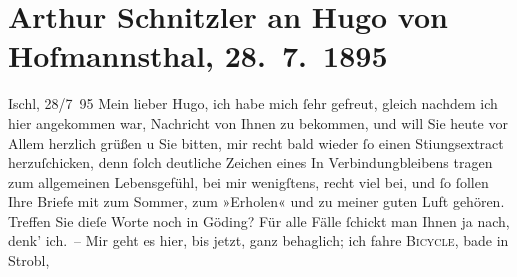

         
         \renewcommand{\erwaehntePersonen}{Personen: Julius Frauenstädt, Paul Goldmann, Hugo von Hofmannsthal, Ernst Otto Lindner, Ludwig Schemann, Arthur Schopenhauer}
         \renewcommand{\erwaehnteOrte}{Orte: Bad Ischl, Hodonín, Kopenhagen, Strobl, Wien}
         \renewcommand{\erwaehnteWerke}{Werke: Arthur Schopenhauer. Von ihm. Über ihn, Die Frau des Weisen. Erzählung, Die Kartause von Parma, Freiwild. Schauspiel in 3 Akten, Schopenhauer-Briefe, West-östlicher Divan}
               \section[Arthur Schnitzler an Hugo von Hofmannsthal, 28. 7. 1895]{ Arthur Schnitzler an Hugo von Hofmannsthal, 28. 7. 1895}\nopagebreak{}\rehead{ }\begin{ledgroupsized}[t]{13cm}\normalsize\beginnumbering{} \toendnotes[C]{\smallbreak\pagebreak[2]} 
\toendnotes[C]{\smallbreak}\pstart
           \raggedleft{}{\pb}Ischl, 28/7 95\pend
           \pstart
           Mein lieber Hugo, ich habe mich ſehr gefreut, gleich nachdem ich
               hier angekommen war, Nachricht von Ihnen zu bekommen, und will Sie heute vor Allem
               herzlich grüßen u Sie bitten, mir recht bald wieder ſo einen Sti{\geminationm}ungsextract herzuſchicken, denn ſolch deutliche Zeichen
               eines In Verbindungbleibens tragen zum allgemeinen Lebensgefühl, bei mir wenigſtens,
               recht viel bei, und ſo ſollen {\pb}Ihre Briefe mit zum
               Sommer, zum »Erholen« und zu meiner guten Luft gehören. Treffen Sie dieſe Worte noch
               in Göding? Für alle Fälle ſchickt man Ihnen ja
               nach, denk’ ich. – Mir geht es hier, bis jetzt, ganz behaglich; ich fahre \textsc{Bicycle}, bade in Strobl,

\end{ledgroupsized}
